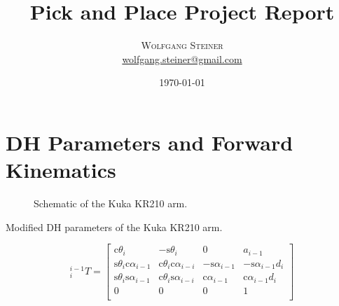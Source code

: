\documentclass[twoside]{article}
\title{Pick and Place Project Report} %
\author{%
\textsc{Wolfgang Steiner} \\[0.5ex] %
\normalsize \href{mailto:wolfgang.steiner@gmail.com}{wolfgang.steiner@gmail.com} %
}
\date{\today} %
\renewcommand{\c}{\text{c}}
\newcommand{\s}{\text{s}}
\newcommand{\T}[2]{\mbox{$_{#2}^{#1}{T}$}}
\begin{document}
\maketitle


\section{DH Parameters and Forward Kinematics}
\begin{figure}[ht]
  \centering 
  \caption{Schematic of the Kuka KR210 arm.}
  \label{fig:schematic}
\end{figure}


\begin{table}[ht]
\caption{Modified DH parameters of the Kuka KR210 arm.}
\label{tab:dh-parameters}

\end{table}

\begin{equation}
\T{i-1}{i} =
\begin{bmatrix}
  \c\theta_i & -\s\theta_i & 0 & a_{i-1} \\
  \s\theta_i\c\alpha_{i-1} & \c\theta_i\c\alpha_{i-i} & -\s\alpha_{i-1} & -\s\alpha_{i-1}d_i \\
  \s\theta_i\s\alpha_{i-1} & \c\theta_i\s\alpha_{i-i} &  \c\alpha_{i-1} &  \c\alpha_{i-1}d_i \\
  0 & 0 & 0 & 1\\
\end{bmatrix}
\end{equation}
\end{document}
